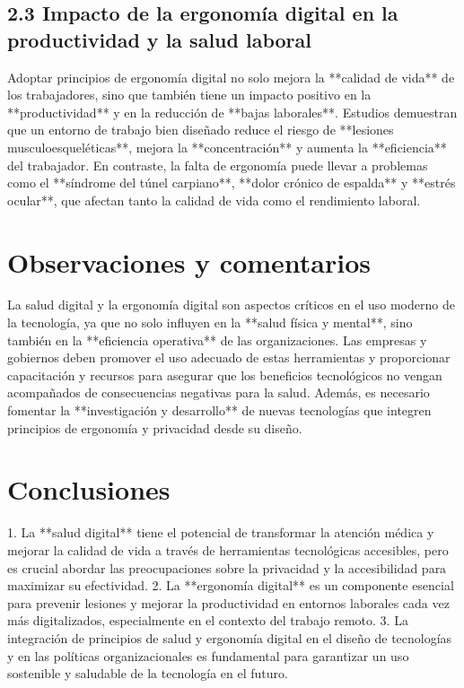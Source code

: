 \documentclass[12pt]{article}
\begin{document}
\subsection{2.3 Impacto de la ergonomía digital en la productividad y la salud laboral}
Adoptar principios de ergonomía digital no solo mejora la **calidad de vida** de los trabajadores, sino que también tiene un impacto positivo en la **productividad** y en la reducción de **bajas laborales**. Estudios demuestran que un entorno de trabajo bien diseñado reduce el riesgo de **lesiones musculoesqueléticas**, mejora la **concentración** y aumenta la **eficiencia** del trabajador. En contraste, la falta de ergonomía puede llevar a problemas como el **síndrome del túnel carpiano**, **dolor crónico de espalda** y **estrés ocular**, que afectan tanto la calidad de vida como el rendimiento laboral.

\section{Observaciones y comentarios}
La salud digital y la ergonomía digital son aspectos críticos en el uso moderno de la tecnología, ya que no solo influyen en la **salud física y mental**, sino también en la **eficiencia operativa** de las organizaciones. Las empresas y gobiernos deben promover el uso adecuado de estas herramientas y proporcionar capacitación y recursos para asegurar que los beneficios tecnológicos no vengan acompañados de consecuencias negativas para la salud. Además, es necesario fomentar la **investigación y desarrollo** de nuevas tecnologías que integren principios de ergonomía y privacidad desde su diseño.

\section{Conclusiones}
1. La **salud digital** tiene el potencial de transformar la atención médica y mejorar la calidad de vida a través de herramientas tecnológicas accesibles, pero es crucial abordar las preocupaciones sobre la privacidad y la accesibilidad para maximizar su efectividad.
2. La **ergonomía digital** es un componente esencial para prevenir lesiones y mejorar la productividad en entornos laborales cada vez más digitalizados, especialmente en el contexto del trabajo remoto.
3. La integración de principios de salud y ergonomía digital en el diseño de tecnologías y en las políticas organizacionales es fundamental para garantizar un uso sostenible y saludable de la tecnología en el futuro.
\end{document}
